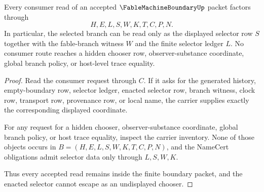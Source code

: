 \begin{theorem}
\label{thm:fable-machine-boundary-selector-nonescape}
Every consumer read of an accepted $\FableMachineBoundaryUp$ packet factors through
$$
H,E,L,S,W,K,T,C,P,N.
$$
In particular, the selected branch can be read only as the displayed selector row $S$ together with the fable-branch witness $W$ and the finite selector ledger $L$. No consumer route reaches a hidden chooser row, observer-substance coordinate, global branch policy, or host-level trace equality.
\end{theorem}
\begin{proof}
Read the consumer request through $C$. If it asks for the generated history, empty-boundary row, selector ledger, enacted selector row, branch witness, clock row, transport row, provenance row, or local name, the carrier supplies exactly the corresponding displayed coordinate.

For any request for a hidden chooser, observer-substance coordinate, global branch policy, or host trace equality, inspect the carrier inventory. None of those objects occurs in $B=(H,E,L,S,W,K,T,C,P,N)$, and the NameCert obligations admit selector data only through $L,S,W,K$.

Thus every accepted read remains inside the finite boundary packet, and the enacted selector cannot escape as an undisplayed chooser.
\end{proof}

